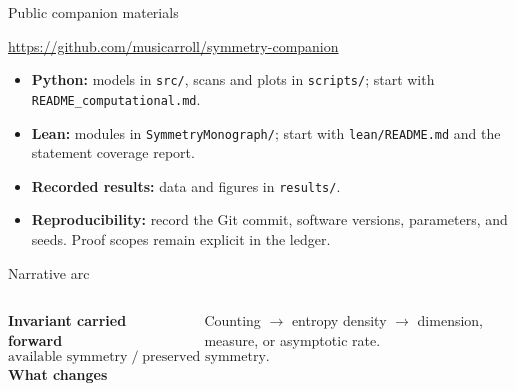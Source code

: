 \begin{frame}{Public companion materials}
  \begin{center}
    \url{https://github.com/musicarroll/symmetry-companion}
  \end{center}
  \begin{itemize}
    \item \textbf{Python:} models in \texttt{src/}, scans and plots in
      \texttt{scripts/}; start with \texttt{README\_computational.md}.
    \item \textbf{Lean:} modules in \texttt{SymmetryMonograph/}; start with
      \texttt{lean/README.md} and the statement coverage report.
    \item \textbf{Recorded results:} data and figures in \texttt{results/}.
    \item \textbf{Reproducibility:} record the Git commit, software versions,
      parameters, and seeds. Proof scopes remain explicit in the ledger.
  \end{itemize}
\end{frame}

\begin{frame}{Narrative arc}
  \begin{center}
  \end{center}

  \vspace{1em}
  \begin{columns}[T]
      \textbf{Invariant carried forward}
      \[
        \text{available symmetry}\;/\;\text{preserved symmetry}.
      \]
      \textbf{What changes}

      Counting $\to$ entropy density $\to$ dimension, measure, or asymptotic
      rate.
  \end{columns}
\end{frame}
